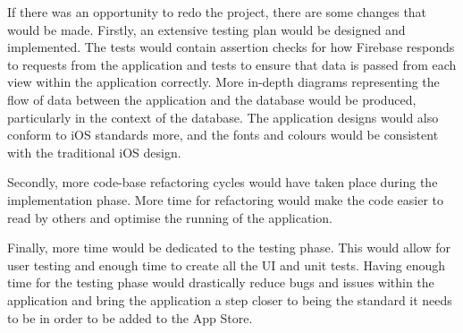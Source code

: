         If there was an opportunity to redo the project, there are some changes that would be made.  Firstly, an extensive testing plan would be designed and implemented.  The tests would contain assertion checks for how Firebase responds to requests from the application and tests to ensure that data is passed from each view within the application correctly.  More in-depth diagrams representing the flow of data between the application and the database would be produced, particularly in the context of the database.  The application designs would also conform to iOS standards more, and the fonts and colours would be consistent with the traditional iOS design.
        
        Secondly, more code-base refactoring cycles would have taken place during the implementation phase.  More time for refactoring would make the code easier to read by others and optimise the running of the application.
        
        Finally, more time would be dedicated to the testing phase.  This would allow for user testing and enough time to create all the UI and unit tests.  Having enough time for the testing phase would drastically reduce bugs and issues within the application and bring the application a step closer to being the standard it needs to be in order to be added to the App Store.